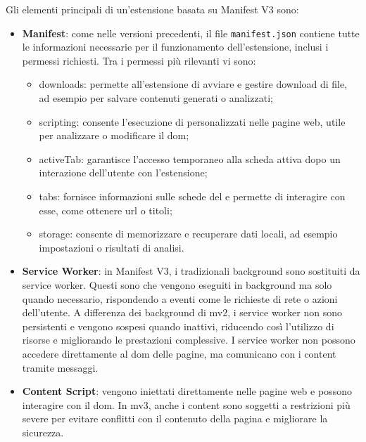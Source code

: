 \noindent Gli elementi principali di un’estensione basata su Manifest V3 sono:
\begin{itemize}
    \item \textbf{Manifest}: come nelle versioni precedenti, il file \texttt{manifest.json} contiene tutte le informazioni necessarie per il funzionamento dell’estensione, inclusi i permessi richiesti. 
    Tra i permessi più rilevanti vi sono: \begin{itemize}
        \item downloads: permette all’estensione di avviare e gestire download di file, ad esempio per salvare contenuti generati o analizzati;
        \item scripting: consente l’esecuzione di  personalizzati nelle pagine web, utile per analizzare o modificare il \acrshort{dom};
        \item activeTab: garantisce l’accesso temporaneo alla scheda attiva dopo un interazione dell’utente con l’estensione;
        \item tabs: fornisce informazioni sulle schede del  e permette di interagire con esse, come ottenere \acrshort{url} o titoli;
        \item storage: consente di memorizzare e recuperare dati locali, ad esempio impostazioni o risultati di analisi.
    \end{itemize}
    \item \textbf{Service Worker}: in Manifest V3, i tradizionali background  sono sostituiti da service worker. Questi sono  che vengono eseguiti in background ma solo quando necessario, rispondendo a eventi come le richieste di rete o azioni dell’utente. A differenza dei background  di \acrshort{mv2}, i service worker non sono persistenti e vengono sospesi quando inattivi, riducendo così l’utilizzo di risorse e migliorando le prestazioni complessive. I service worker non possono accedere direttamente al \acrshort{dom} delle pagine, ma comunicano con i content  tramite messaggi.
    \item \textbf{Content Script}: vengono iniettati direttamente nelle pagine web e possono interagire con il \acrshort{dom}. In \acrshort{mv3}, anche i content  sono soggetti a restrizioni più severe per evitare conflitti con il contenuto della pagina e migliorare la sicurezza.
\end{itemize}


